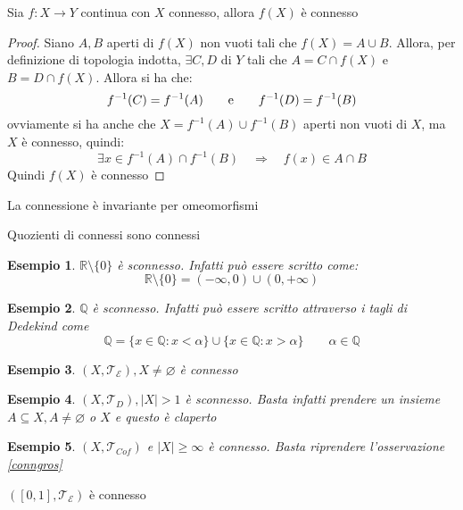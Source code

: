 \documentclass[11pt,a4paper,twoside]{article}
\newtheorem{es}{Esempio}
\theoremstyle{definition}
\begin{document}
\begin{prop}{}{}
	Sia $f:X \to Y$ continua con $X$ connesso, allora $f(X)$ è connesso
\end{prop}
\begin{proof}
	Siano $A, B$ aperti di $f(X)$ non vuoti tali che $f(X) = A \cup B$. Allora, per definizione di topologia indotta, $\exists C, D$ di $Y$ tali che $A = C \cap f(X)$ e $B = D \cap f(X)$. Allora si ha che:
	\[ f^{-1}(C) = f^{-1}(A) \qquad \text e \qquad f^{-1}(D) = f^{-1}(B) \]
	ovviamente si ha anche che $X = f^{-1}(A) \cup f^{-1}(B)$ aperti non vuoti di $X$, ma $X$ è connesso, quindi:
	\[ \exists x \in f^{-1}(A)\cap f^{-1}(B) \quad \Rightarrow\quad f(x) \in A \cap B \]
	Quindi $f(X)$ è connesso
\end{proof}

\begin{cor}{}{}
	La connessione è invariante per omeomorfismi
\end{cor}

\begin{cor}{}{}
	Quozienti di connessi sono connessi
\end{cor}

\begin{es}
	$\mathbb R \setminus \{0\}$ è sconnesso. Infatti può essere scritto come:
	\[ \mathbb R \setminus \{0\} = (-\infty,0) \cup (0, + \infty) \]
\end{es}

\begin{es}
	$\mathbb Q$ è sconnesso. Infatti può essere scritto attraverso i tagli di Dedekind come
	\[ \mathbb Q = \{x \in \mathbb Q: x < \alpha\}\cup \{x \in \mathbb Q: x > \alpha\}\qquad \alpha \in \mathbb Q \]
\end{es}

\begin{es}
	$(X, \mathcal T_\mathcal E), X \neq \varnothing$ è connesso
\end{es}

\begin{es}
	$(X, \mathcal T_D), |X|>1$ è sconnesso. Basta infatti prendere un insieme $A \subseteq X, A \neq \varnothing$ o $X$ e questo è claperto
\end{es}

\begin{es}
	$(X, \mathcal T_{Cof})$ e $|X|\geq \infty$ è connesso. Basta riprendere l'osservazione \ref{conngros}
\end{es}

\begin{thm}{}{}\label{01conn}
	$([0,1], \mathcal T_\mathcal E)$ è connesso
\end{thm}
\end{document}
